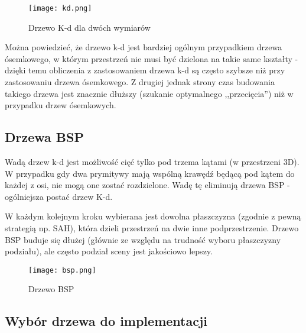 \begin{figure}[H]
\centering
  \texttt{[image: kd.png]}
  \caption{Drzewo K-d dla dwóch wymiarów}
\end{figure}

Można powiedzieć, że drzewo k-d jest bardziej ogólnym przypadkiem drzewa ósemkowego, w którym przestrzeń nie musi być dzielona na takie same kształty - dzięki temu obliczenia z zastosowaniem drzewa k-d są często szybsze niż przy zastosowaniu drzewa ósemkowego. Z drugiej jednak strony czas budowania takiego drzewa jest znacznie dłuższy (szukanie optymalnego ,,przecięcia'') niż w przypadku drzew ósemkowych.


\subsection{Drzewa BSP}

Wadą drzew k-d jest możliwość cięć tylko pod trzema kątami (w przestrzeni 3D). W przypadku gdy dwa prymitywy mają wspólną krawędź będącą pod kątem do każdej z osi, nie mogą one zostać rozdzielone. Wadę tę eliminują drzewa BSP - ogólniejsza postać drzew K-d.

W każdym kolejnym kroku wybierana jest dowolna płaszczyzna (zgodnie z pewną strategią np. SAH), która dzieli przestrzeń na dwie inne podprzestrzenie. Drzewo BSP buduje się dłużej (głównie ze względu na trudność wyboru płaszczyzny podziału), ale często podział sceny jest jakościowo lepszy.

\begin{figure}[H]
\centering
  \texttt{[image: bsp.png]}
  \caption{Drzewo BSP}
\end{figure}


\subsection{Wybór drzewa do implementacji}

